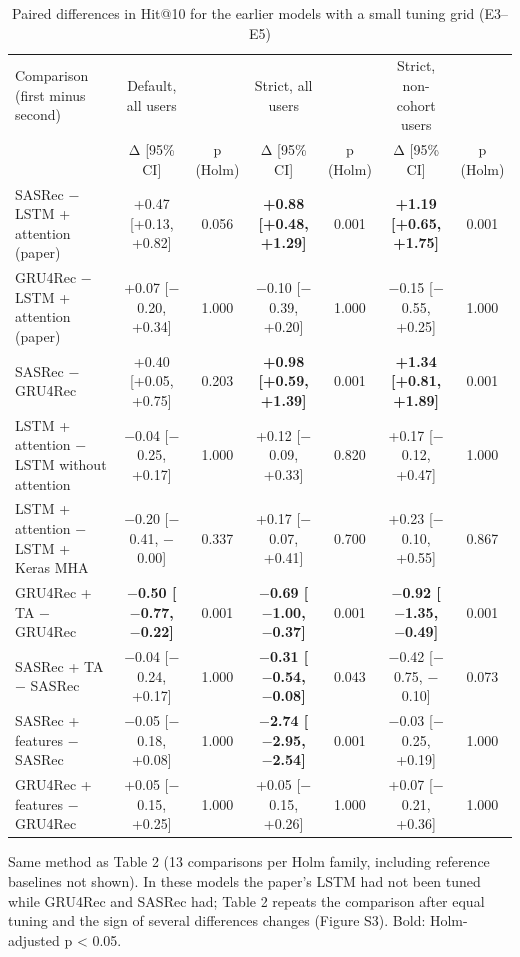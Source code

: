 \begin{table}[t]\centering\footnotesize
\caption{Paired differences in Hit@10 for the earlier models with a small tuning grid (E3–E5)}
\begin{tabular}{lcccccc}\toprule
Comparison (first minus second) & Default, all users &  & Strict, all users &  & Strict, non-cohort users &  \\
 & Δ [95\% CI] & p (Holm) & Δ [95\% CI] & p (Holm) & Δ [95\% CI] & p (Holm) \\
\midrule
SASRec $-$ LSTM + attention (paper) & +0.47 [+0.13, +0.82] & 0.056 & \textbf{+0.88 [+0.48, +1.29]} & 0.001 & \textbf{+1.19 [+0.65, +1.75]} & 0.001 \\
GRU4Rec $-$ LSTM + attention (paper) & +0.07 [$-$0.20, +0.34] & 1.000 & $-$0.10 [$-$0.39, +0.20] & 1.000 & $-$0.15 [$-$0.55, +0.25] & 1.000 \\
SASRec $-$ GRU4Rec & +0.40 [+0.05, +0.75] & 0.203 & \textbf{+0.98 [+0.59, +1.39]} & 0.001 & \textbf{+1.34 [+0.81, +1.89]} & 0.001 \\
LSTM + attention $-$ LSTM without attention & $-$0.04 [$-$0.25, +0.17] & 1.000 & +0.12 [$-$0.09, +0.33] & 0.820 & +0.17 [$-$0.12, +0.47] & 1.000 \\
LSTM + attention $-$ LSTM + Keras MHA & $-$0.20 [$-$0.41, $-$0.00] & 0.337 & +0.17 [$-$0.07, +0.41] & 0.700 & +0.23 [$-$0.10, +0.55] & 0.867 \\
GRU4Rec + TA $-$ GRU4Rec & \textbf{$-$0.50 [$-$0.77, $-$0.22]} & 0.001 & \textbf{$-$0.69 [$-$1.00, $-$0.37]} & 0.001 & \textbf{$-$0.92 [$-$1.35, $-$0.49]} & 0.001 \\
SASRec + TA $-$ SASRec & $-$0.04 [$-$0.24, +0.17] & 1.000 & \textbf{$-$0.31 [$-$0.54, $-$0.08]} & 0.043 & $-$0.42 [$-$0.75, $-$0.10] & 0.073 \\
SASRec + features $-$ SASRec & $-$0.05 [$-$0.18, +0.08] & 1.000 & \textbf{$-$2.74 [$-$2.95, $-$2.54]} & 0.001 & $-$0.03 [$-$0.25, +0.19] & 1.000 \\
GRU4Rec + features $-$ GRU4Rec & +0.05 [$-$0.15, +0.25] & 1.000 & +0.05 [$-$0.15, +0.26] & 1.000 & +0.07 [$-$0.21, +0.36] & 1.000 \\
\bottomrule
\end{tabular}
\par\smallskip\footnotesize Same method as Table 2 (13 comparisons per Holm family, including reference baselines not shown). In these models the paper's LSTM had not been tuned while GRU4Rec and SASRec had; Table 2 repeats the comparison after equal tuning and the sign of several differences changes (Figure S3). Bold: Holm-adjusted p < 0.05.
\end{table}